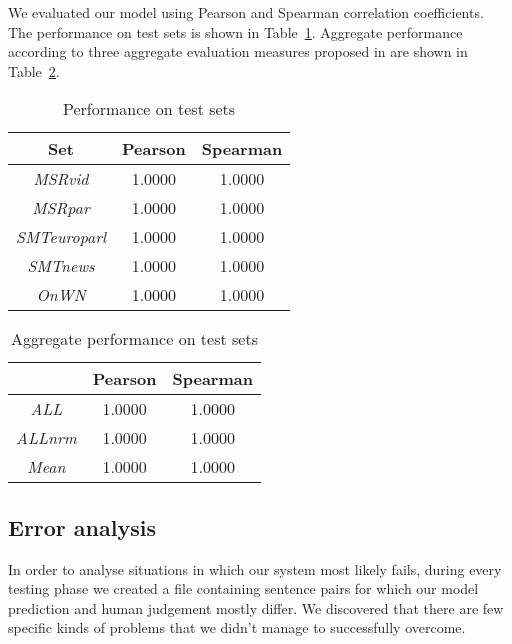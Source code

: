 \documentclass[10pt, a4paper]{article}
\begin{document}
We evaluated our model using Pearson and Spearman correlation coefficients. The performance on test sets is shown in Table~\ref{tab:test-results-table}. Aggregate performance according to three aggregate evaluation measures proposed in \citep{agirre2012semeval} are shown in Table~\ref{tab:all-results-table}.

\begin{table}[h]
\caption{Performance on test sets}
\label{tab:test-results-table}
\begin{center}
\begin{tabular}{ccc}
\toprule
Set & Pearson & Spearman \\
\midrule
\textit{MSRvid} & 1.0000 & 1.0000 \\
\textit{MSRpar} & 1.0000 & 1.0000 \\
\textit{SMTeuroparl} & 1.0000 & 1.0000 \\
\textit{SMTnews} & 1.0000 & 1.0000 \\
\textit{OnWN} & 1.0000 & 1.0000 \\
\bottomrule
\end{tabular}
\end{center}
\end{table}

\begin{table}[h]
\caption{Aggregate performance on test sets}
\label{tab:all-results-table}
\begin{center}
\begin{tabular}{ccc}
\toprule
& Pearson & Spearman \\
\midrule
\textit{ALL} & 1.0000 & 1.0000 \\
\textit{ALLnrm} & 1.0000 & 1.0000 \\
\textit{Mean} & 1.0000 & 1.0000 \\
\bottomrule
\end{tabular}
\end{center}
\end{table}


\subsection{Error analysis}

In order to analyse situations in which our system most likely fails, during every testing phase we created a file containing sentence pairs for which our model prediction and human judgement mostly differ. We discovered that there are few specific kinds of problems that we didn't manage to successfully overcome.
\end{document}
